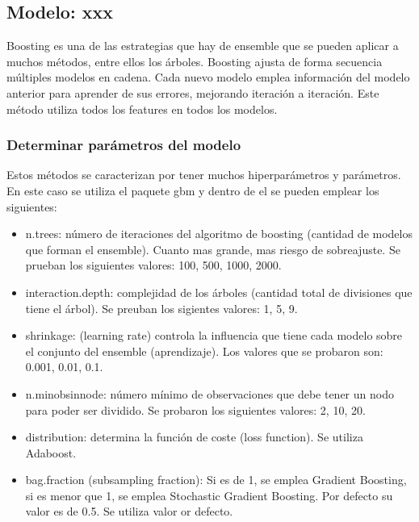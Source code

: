 \subsection{Modelo: xxx}

Boosting es una de las estrategias que hay de ensemble que se pueden
aplicar a muchos métodos, entre ellos los árboles. Boosting ajusta de
forma secuencia múltiples modelos en cadena. Cada nuevo modelo emplea
información del modelo anterior para aprender de sus errores, mejorando
iteración a iteración. Este método utiliza todos los features en todos los modelos.


\subsubsection{Determinar parámetros del modelo}

Estos métodos se caracterizan por tener muchos hiperparámetros y
parámetros. En este caso se utiliza el paquete gbm y dentro de el se
pueden emplear los siguientes:

\begin{itemize}
	\item
	n.trees: número de iteraciones del algoritmo de boosting (cantidad de
	modelos que forman el ensemble). Cuanto mas grande, mas riesgo de
	sobreajuste. Se prueban los siguientes valores: 100, 500, 1000, 2000.
	\item
	interaction.depth: complejidad de los árboles (cantidad total de
	divisiones que tiene el árbol). Se preuban los sigientes valores: 1,
	5, 9.
	\item
	shrinkage: (learning rate) controla la influencia que tiene cada modelo
	sobre el conjunto del ensemble (aprendizaje). Los valores que se
	probaron son: 0.001, 0.01, 0.1.
	\item
	n.minobsinnode: número mínimo de observaciones que debe tener un nodo
	para poder ser dividido. Se probaron los siguientes valores: 2, 10, 20.
	\item
	distribution: determina la función de coste (loss function). Se utiliza
	Adaboost.
	\item
	bag.fraction (subsampling fraction): Si es de 1, se emplea Gradient
	Boosting, si es menor que 1, se emplea Stochastic Gradient Boosting. Por
	defecto su valor es de 0.5. Se utiliza valor or defecto.
\end{itemize}

